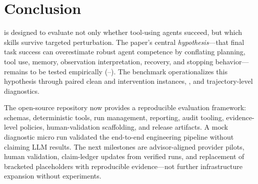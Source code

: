 \section{Conclusion}

\benchmark is designed to evaluate not only whether tool-using agents succeed, but which skills survive targeted perturbation. The paper's central \emph{hypothesis}---that final task success can overestimate robust agent competence by conflating planning, tool use, memory, observation interpretation, recovery, and stopping behavior---remains to be tested empirically (--). The benchmark operationalizes this hypothesis through paired clean and intervention instances, \acrs, and trajectory-level diagnostics.

The open-source repository now provides a reproducible evaluation framework: schemas, deterministic tools, run management, reporting, audit tooling, evidence-level policies, human-validation scaffolding, and release artifacts. A mock diagnostic micro run validated the end-to-end engineering pipeline without claiming LLM results. The next milestones are advisor-aligned provider pilots, human validation, claim-ledger updates from verified runs, and replacement of bracketed placeholders with reproducible evidence---not further infrastructure expansion without experiments.
